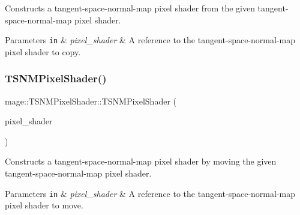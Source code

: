 Constructs a tangent-\/space-\/normal-\/map pixel shader from the given tangent-\/space-\/normal-\/map pixel shader.


\begin{DoxyParams}[1]{Parameters}
\mbox{\tt in}  & {\em pixel\+\_\+shader} & A reference to the tangent-\/space-\/normal-\/map pixel shader to copy. \\
\hline
\end{DoxyParams}
\hypertarget{classmage_1_1_t_s_n_m_pixel_shader_a4889850bd4ff6c3a3d22c9637752ce37}{}\label{classmage_1_1_t_s_n_m_pixel_shader_a4889850bd4ff6c3a3d22c9637752ce37} 
\subsubsection{\texorpdfstring{T\+S\+N\+M\+Pixel\+Shader()}{TSNMPixelShader()}\hspace{0.1cm}{\footnotesize\ttfamily [4/4]}}
{\footnotesize\ttfamily mage\+::\+T\+S\+N\+M\+Pixel\+Shader\+::\+T\+S\+N\+M\+Pixel\+Shader (\begin{DoxyParamCaption}\item[{\hyperlink{classmage_1_1_t_s_n_m_pixel_shader}{T\+S\+N\+M\+Pixel\+Shader} \&\&}]{pixel\+\_\+shader }\end{DoxyParamCaption})\hspace{0.3cm}{\ttfamily [default]}}

Constructs a tangent-\/space-\/normal-\/map pixel shader by moving the given tangent-\/space-\/normal-\/map pixel shader.


\begin{DoxyParams}[1]{Parameters}
\mbox{\tt in}  & {\em pixel\+\_\+shader} & A reference to the tangent-\/space-\/normal-\/map pixel shader to move. \\
\hline
\end{DoxyParams}
\hypertarget{classmage_1_1_t_s_n_m_pixel_shader_ae7c20ffb872faffb28714b39916e4250}{}\label{classmage_1_1_t_s_n_m_pixel_shader_ae7c20ffb872faffb28714b39916e4250} 
